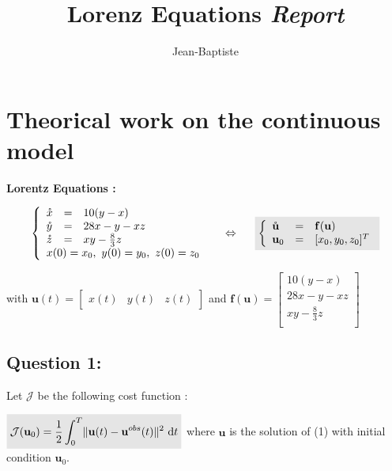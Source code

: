 \documentclass[11pt,a4paper]{article}
\title{
      \bsc{TP Inverse Methods}
      \vskip 1cm
      {\colorb\textbf{Lorenz Equations}}
      \vskip 1cm
      \colorb\textit{Report}
  }
\author{%
    Jean-Baptiste \bsc{Keck}
    \vskip 0.5cm
    \bsc{M2 Msiam}
}
\makeatletter
\newcommand{\colora}{\color{Blue}}
\def\maketitle{%
    \begin{flushleft}
        \normalfont\LARGE\par
    \end{flushleft}
    \vskip 3cm
    \begin{center}%
        {\colora\specialrule{.2em}{0em}{0em}}
        \vskip 1cm
        {\Huge \@title}%
        \vskip 1cm
        {\colora\specialrule{.2em}{0em}{0em}}
        \vskip 5cm
        {\Huge \@author\par}%
        \vskip 2cm
        {\Huge \@date\par}%
        \vskip 1cm

    \end{center}%
    \clearpage
}
\renewcommand{\norm}[1]{\lVert #1 \rVert}
\renewcommand{\dt}{\ \mathrm{d}t}
\renewcommand{\u} {\mathbf{u}}
\renewcommand{\f} {\mathbf{f}}
\renewcommand{\ud}{\mathring{\mathbf{u}}}
\renewcommand{\uobs}{\mathbf{u}^{obs}}}
\renewcommand{\J}{\mathcal{J}}
\renewcommand{\colbox}[1]{\colorbox{lightgray}{$ #1 $}}
\makeatother
\begin{document}
\pagestyle{fancy}

\maketitle

\clearpage

\section{Theorical work on the continuous model}

\textbf{Lorentz Equations :}
\vskip 0.2cm

$$
\begin{equation} \label{eq:lorentz}
\left \{
\begin{array}{l c l}
    \mathring{x} & = & 10(y - x)\\
    \mathring{y} & = & 28x - y -xz\\
    \mathring{z} & = & xy - \frac{8}{3}z\\
    \multicolumn{3}{l}{x(0) = x_0,\ y(0) = y_0,\ z(0) = z_0}
\end{array}
\right .
\hskip 0.5cm
\Leftrightarrow 
\hskip 0.5cm
\colbox{
\left \{
\begin{array}{l c l}
\ud&=&\f(\u) \\
\u_0&=&[x_0, y_0, z_0]^T
\end{array}
\right .
}
\end{equation}
$$

with $\u(t) = 
\left [
    \begin{array}{c}
        x(t)&
        y(t)&
        z(t)
    \end{array}
\right ]$
and $\f(\u) =
\left [
    \begin{array}{c}
        10(y - x)\\
        28x - y -xz\\
        xy - \frac{8}{3}z\\
    \end{array}
\right ]
$

\vskip 0.5cm
\subsection{Question 1:} 

\vskip 0.3cm
\noindent Let $\J$ be the following cost function :
\vskip 0.3cm

$\colbox{\J(\u_0) = \dfrac{1}{2}\displaystyle \int_0^T\norm{\u(t)-\uobs(t)}^2 \dt}$ where $\u$ is the solution of (1) with initial condition $\u_0$.
\end{document}
